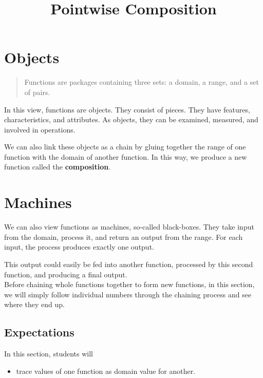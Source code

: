 \documentclass{ximera}
\title{Pointwise Composition}
\begin{document}
\begin{abstract}
\end{abstract}
\maketitle



\section{Objects}


\begin{quote}
Functions are packages containing three sets: a domain, a range, and a set of pairs.
\end{quote}

In this view, functions are objects.  They consist of pieces. They have features, characteristics, and attributes.  As objects, they can be examined, measured, and involved in operations.


We can also link these objects as a chain by gluing together the range of one function with the domain of another function.  In this way, we produce a new function called the \textbf{composition}.












\section{Machines}



We can also view functions as machines, so-called black-boxes.  They take input from the domain, process it, and return an output from the range.  For each input, the process produces exactly one output.



This output could easily be fed into another function, processed by this second function, and producing a final output. \\



Before chaining whole functions together to form new functions, in this section, we will simply follow individual numbers through the chaining process and see where they end up.















\subsection{Expectations}


\begin{sectionOutcomes}
In this section, students will 

\begin{itemize}
\item trace values of one function as domain value for another.

\end{itemize}
\end{sectionOutcomes}
\end{document}
